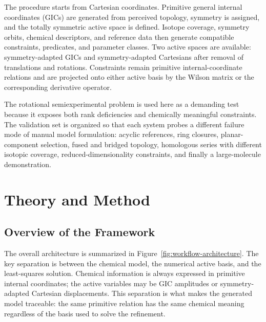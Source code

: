 \documentclass[aip,jcp,reprint,longbibliography,floatfix]{revtex4-2}
\begin{document}
The procedure starts from Cartesian coordinates. Primitive general internal
coordinates (GICs) are generated from perceived topology, symmetry is assigned,
and the totally symmetric active space is defined. Isotope coverage, symmetry
orbits, chemical descriptors, and reference data then generate compatible
constraints, predicates, and parameter classes. Two active spaces are available:
symmetry-adapted GICs and symmetry-adapted Cartesians after removal of
translations and rotations. Constraints remain primitive internal-coordinate
relations and are projected onto either active basis by the Wilson matrix or the
corresponding derivative operator.\cite{Wilson1955}

The rotational semiexperimental problem is used here as a demanding test
because it exposes both rank deficiencies and chemically meaningful
constraints. The validation set is organized so that each system probes a
different failure mode of manual model formulation: acyclic references, ring
closures, planar-component selection, fused and bridged topology, homologous
series with different isotopic coverage, reduced-dimensionality constraints,
and finally a large-molecule demonstration.


\section{Theory and Method}

\subsection{Overview of the Framework}

The overall architecture is summarized in
Figure~\ref{fig:workflow-architecture}. The key separation is between the
chemical model, the numerical active basis, and the least-squares solution.
Chemical information is always expressed in primitive internal coordinates;
the active variables may be GIC amplitudes or symmetry-adapted Cartesian
displacements. This separation is what makes the generated model traceable:
the same primitive relation has the same chemical meaning regardless of the
basis used to solve the refinement.
\end{document}
